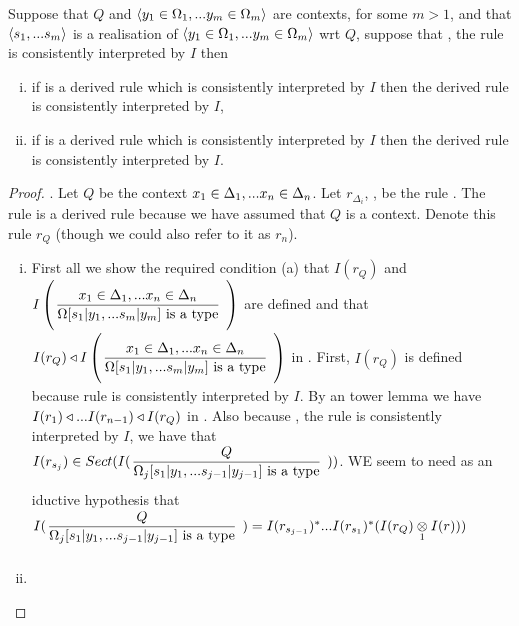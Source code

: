 \begin{lemma}
Suppose that $Q$ and $\langle y_1 \in \Omega_1,... y_{m} \in \Omega_{m}\rangle$ are contexts, for some $m >1$, and that $\langle s_1,...s_{m}\rangle$ is a realisation of $\langle y_1 \in \Omega_1,... y_{m} \in \Omega_{m}\rangle$ wrt $Q$,
suppose that \foreachj, the rule
 is consistently interpreted by $I$ then
\begin{enumerate}[(i)]
\item if \ZOmega is a derived rule which is consistently interpreted by $I$
then the derived rule 
\ZOmegaSUBsmFORym is consistently interpreted by $I$,
\item if \ZsOmega is a derived rule which is consistently interpreted by $I$
then the derived rule 
\ZsOmegaSUBsmFORym is consistently interpreted by $I$.
\end{enumerate}
\end{lemma}
\begin{proof}
.
Let $Q$ be the context $x_1 \in \Delta_1,... x_{n} \in \Delta_{n}$. Let $r_{\Delta_i}$, \foreachi, be the rule .
\newcommand{\targetruleone}{\gatdisplayrule{\xDelta{n}}{\isT{\Omega[\SUBsFORy{m}]}}}
\newcommand{\Qtargetruleone}{\gatdisplayrule{\xDelta{n}}{\isT{\Omega[\SUBsFORy{m}]}}}
The rule  is a derived rule because we have assumed that $Q$ is a context. Denote this rule $r_Q$ (though we could also refer to it as $r_n$).
\begin{enumerate}[(i)]
\item
First all we show the required condition (a) that $I(r_Q)$ 
and $\Imap{\Qtargetruleone}$ are defined and that 
$I(r_Q) \base \Imap{\Qtargetruleone}$ in \catc. 
First, $I(r_Q)$ is defined because rule  is consistently interpreted by $I$. 
By an  tower lemma we have $I(r_1) \triangleleft ... I(r_{n-1}) \triangleleft I(r_Q)$ in \catc.
Also because \foreachj, the rule  is consistently interpreted by $I$, 
we have that $I(r_{s_j}) \in Sect(I(\mbox{\gatdisplayrule{Q}{\isT{\Omega_j[\SUBsFORy{j-1}]}}}))$.
WE seem to need as an iductive hypothesis that 
$I(\mbox{\gatdisplayrule{Q}{\isT{\Omega_j[\SUBsFORy{j-1}]}}})=I(r_{s_{j-1}})^*...I(r_{s_1})^*(\crossx{I(r_Q)}{I(r)}{1}))$
\item
\end{enumerate}
\end{proof}

\newpage


